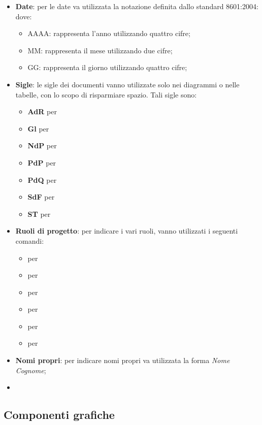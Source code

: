 		\begin{itemize}
			\item \textbf{Date}: per le date va utilizzata la notazione definita dallo standard  8601:2004:
			dove:
			\begin{itemize}
				\item AAAA: rappresenta l'anno utilizzando quattro cifre;
				\item MM: rappresenta il mese utilizzando due cifre;
				\item GG: rappresenta il giorno utilizzando quattro cifre;
			\end{itemize}
			\item \textbf{Sigle}: le sigle dei documenti vanno utilizzate solo nei diagrammi o nelle tabelle, con lo scopo di risparmiare spazio. Tali sigle sono:
			\begin{itemize}
				\item \textbf{AdR} per \ARdoc
				\item \textbf{Gl} per \Gldoc
				\item \textbf{NdP} per \NPdoc
				\item \textbf{PdP} per \PPdoc
				\item \textbf{PdQ} per \PQdoc
				\item \textbf{SdF} per \SFdoc
				\item \textbf{ST} per \STdoc
			\end{itemize}	
			\item \textbf{Ruoli di progetto}: per indicare i vari ruoli, vanno utilizzati i seguenti comandi:
			\begin{itemize}
				\item {} per \AM
				\item {} per \AN
				\item {} per \PR
				\item {} per \PRJ
				\item {} per \RES
				\item {} per \VER
			\end{itemize}
			\item \textbf{Nomi propri}: per indicare nomi propri va utilizzata la forma \textit{Nome Cognome};
			\item
		\end{itemize}
	\subsection{Componenti grafiche}		
